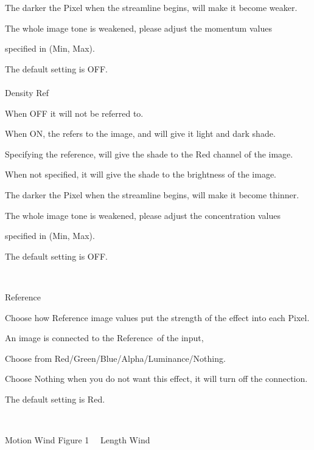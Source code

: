 \documentclass[a4paper,12pt]{article}
\begin{document}
The darker the Pixel when the streamline begins, will make it become weaker.\par
The whole image tone is weakened, please adjust the momentum values\par
specified in (Min, Max).\par
The default setting is OFF.\\
\\
Density Ref\par
When OFF it will not be referred to.\par
When ON, the refers to the image, and will give it light and dark shade.\par
Specifying the reference, will give the shade to the Red channel of the image.\par
When not specified, it will give the shade to the brightness of the image.\par
The darker the Pixel when the streamline begins, will make it become thinner.\par
The whole image tone is weakened, please adjust the concentration values\par
specified in (Min, Max).\par
The default setting is OFF.

\newpage

\thispagestyle{empty}

\ \vspace{1.3em}
\par
\noindent Reference\par
Choose how Reference image values put the strength of the effect into each Pixel.\par
An image is connected to the \textquotedbl Reference\textquotedbl \ of the input,\par
Choose from Red/Green/Blue/Alpha/Luminance/Nothing.\par
Choose Nothing when you do not want this effect, it will turn off the connection.\par
The default setting is Red.

\newpage

\thispagestyle{empty}

\ \vspace{-0.2em}
\par
\noindent Motion Wind Figure 1 \ \ Length Wind
\end{document}
